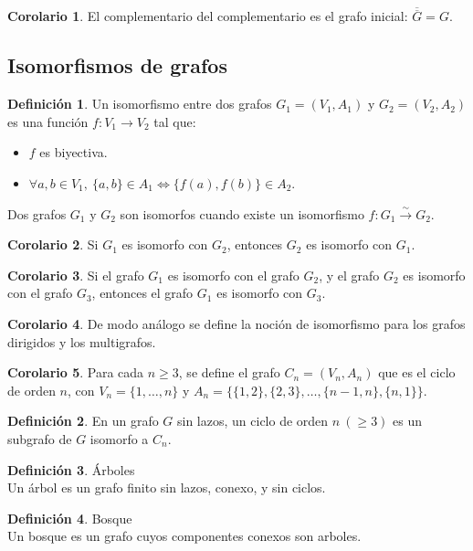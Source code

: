\documentclass[10pt]{article}
\theoremstyle{definition}
\newtheorem{definition}{Definición}[section]
\newtheorem{corollary}{Corolario}[theorem]
\begin{document}
    \begin{corollary}
        El complementario del complementario es el grafo inicial: $\overline{\overline{G}}=G$.
    \end{corollary}
    \newpage\subsection{Isomorfismos de grafos}
    \begin{definition}
        Un isomorfismo entre dos grafos $G_1=(V_1,A_1)$ y $G_2=(V_2,A_2)$ es una función $f:V_1\to V_2$ tal que:
        \begin{itemize}
            \item $f$ es biyectiva.
            \item $\forall a,b\in V_1,\ \{a,b\}\in A_1\Leftrightarrow\{f(a),f(b)\}\in A_2$.
        \end{itemize}
        Dos grafos $G_1$ y $G_2$ son isomorfos cuando existe un isomorfismo $f:G_1\xrightarrow{\sim} G_2$.
    \end{definition}
    \begin{corollary}
        Si $G_1$ es isomorfo con $G_2$, entonces $G_2$ es isomorfo con $G_1$.
    \end{corollary}
    \begin{corollary}
        Si el grafo $G_1$ es isomorfo con el grafo $G_2$, y el grafo $G_2$ es isomorfo con el grafo $G_3$, entonces el grafo $G_1$ es isomorfo con $G_3$.
    \end{corollary}
    \begin{corollary}
        De modo análogo se define la noción de isomorfismo para los grafos dirigidos y los multigrafos.
    \end{corollary}
    \begin{corollary}
        Para cada $n\ge 3$, se define el grafo $C_n=(V_n,A_n)$ que es el ciclo de orden $n$, con $V_n=\{1,\dots,n\}$ y $A_n=\{\{1,2\},\{2,3\},\dots,\{n-1,n\},\{n,1\}\}$.
    \end{corollary}
    \begin{definition}
        En un grafo $G$ sin lazos, un ciclo de orden $n\ (\ge 3)$ es un subgrafo de $G$ isomorfo a $C_n$.
    \end{definition}
    \begin{definition}{Árboles}
       \\Un árbol es un grafo finito sin lazos, conexo, y sin ciclos. 
    \end{definition}
    \begin{definition}{Bosque}
        \\Un bosque es un grafo cuyos componentes conexos son arboles.
    \end{definition}
\end{document}
